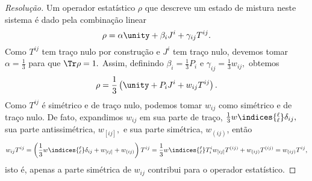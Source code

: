 \begin{proof}[Resolução]
    Um operador estatístico \(\rho\) que descreve um estado de mistura neste sistema é dado pela combinação linear
    \begin{equation*}
        \rho = \alpha\unity + \beta_i J^i + \gamma_{ij} T^{ij}.
    \end{equation*}
    Como \(T^{ij}\) tem traço nulo por construção e \(J^i\) tem traço nulo, devemos tomar \(\alpha = \frac13\) para que \(\Tr\rho = 1.\) Assim, definindo \(\beta_i = \frac13 P_i\) e \(\gamma_{ij} = \frac13 w_{ij},\) obtemos
    \begin{equation*}
        \rho = \frac13 \left(\unity + P_i J^i + w_{ij} T^{ij}\right).
    \end{equation*}
    Como \(T^{ij}\) é simétrico e de traço nulo, podemos tomar \(w_{ij}\) como simétrico e de traço nulo. De fato, expandimos \(w_{ij}\) em sua parte de traço, \(\frac13 w\indices{^\ell_{\ell}}\delta_{ij},\) sua parte antissimétrica, \(w_{[ij]},\) e sua parte simétrica, \(w_{(ij)}\), então
    \begin{equation*}
        w_{ij} T^{ij} = \left(\frac13 w\indices{^\ell_{\ell}} \delta_{ij} + w_{[ij]}+ w_{(ij)}\right)T^{ij} = \frac13 w\indices{^\ell_\ell} T^i_i w_{[ij]} T^{(ij)} + w_{(ij)}T^{(ij)} = w_{(ij)} T^{ij},
    \end{equation*}
    isto é, apenas a parte simétrica de \(w_{ij}\) contribui para o operador estatístico.


\end{proof}
